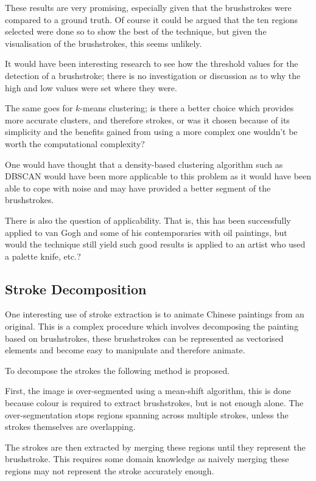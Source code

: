 \documentclass[conference]{IEEEtran}
\begin{document}
These results are very promising, especially given that the brushstrokes were
compared to a ground truth. Of course it could be argued that the ten regions
selected were done so to show the best of the technique, but given the
visualisation of the brushstrokes, this seems unlikely.

It would have been interesting research to see how the threshold values for the
detection of a brushstroke; there is no investigation or discussion as to why
the high and low values were set where they were.

The same goes for $k$-means clustering; is there a better choice which provides
more accurate clusters, and therefore strokes, or was it chosen because of its
simplicity and the benefits gained from using a more complex one wouldn't be
worth the computational complexity?

One would have thought that a density-based clustering algorithm such as
DBSCAN\cite{kriegel11density} would have been more applicable to this problem
as it would have been able to cope with noise and may have provided a better
segment of the brushstrokes.

There is also the question of applicability. That is, this has been 
successfully applied to van Gogh and some of his contemporaries with oil
paintings, but would the technique still yield such good results is applied to
an artist who used a palette knife, etc.?


\subsection{Stroke Decomposition}

One interesting use of stroke extraction is to animate Chinese paintings from
an original\cite{xu2006animating}. This is a complex procedure which involves
decomposing the painting based on brushstrokes, these brushstrokes can be
represented as vectorised elements and become easy to manipulate and therefore
animate.

To decompose the strokes the following method is proposed.

First, the image is over-segmented using a mean-shift algorithm, this is done
because colour is required to extract brushstrokes, but is not enough alone.
The over-segmentation stops regions spanning across multiple strokes, unless
the strokes themselves are overlapping.

The strokes are then extracted by merging these regions until they represent
the brushstroke. This requires some domain knowledge as naively merging these
regions may not represent the stroke accurately enough.
\end{document}
